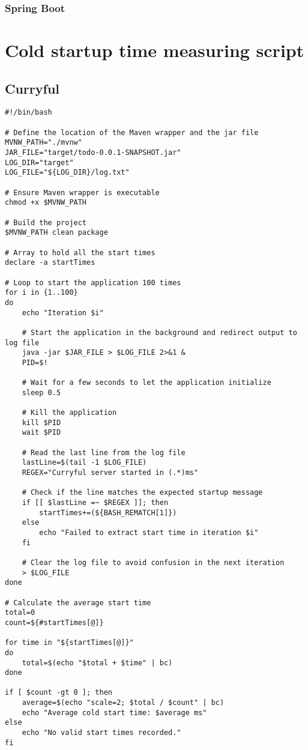 \documentclass[a4paper]{article}
\begin{document}
\subsubsection{Spring Boot}

\section{Cold startup time measuring script}
\subsection{Curryful}
\begin{lstlisting}
#!/bin/bash

# Define the location of the Maven wrapper and the jar file
MVNW_PATH="./mvnw"
JAR_FILE="target/todo-0.0.1-SNAPSHOT.jar"
LOG_DIR="target"
LOG_FILE="${LOG_DIR}/log.txt"

# Ensure Maven wrapper is executable
chmod +x $MVNW_PATH

# Build the project
$MVNW_PATH clean package

# Array to hold all the start times
declare -a startTimes

# Loop to start the application 100 times
for i in {1..100}
do
	echo "Iteration $i"

	# Start the application in the background and redirect output to log file
	java -jar $JAR_FILE > $LOG_FILE 2>&1 &
	PID=$!

	# Wait for a few seconds to let the application initialize
	sleep 0.5

	# Kill the application
	kill $PID
	wait $PID

	# Read the last line from the log file
	lastLine=$(tail -1 $LOG_FILE)
	REGEX="Curryful server started in (.*)ms"

	# Check if the line matches the expected startup message
	if [[ $lastLine =~ $REGEX ]]; then
		startTimes+=(${BASH_REMATCH[1]})
	else
		echo "Failed to extract start time in iteration $i"
	fi

	# Clear the log file to avoid confusion in the next iteration
	> $LOG_FILE
done

# Calculate the average start time
total=0
count=${#startTimes[@]}

for time in "${startTimes[@]}"
do
	total=$(echo "$total + $time" | bc)
done

if [ $count -gt 0 ]; then
	average=$(echo "scale=2; $total / $count" | bc)
	echo "Average cold start time: $average ms"
else
	echo "No valid start times recorded."
fi
\end{lstlisting}
\end{document}
